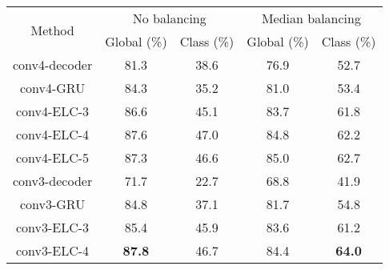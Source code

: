 \documentclass[10pt,twocolumn,letterpaper]{article}
\begin{document}


\begin{table*}
\begin{center}
\label{table:acs}
\begin{tabular}{c|c|c|c|c}
\hline
\multirow{2}{*}{Method} & \multicolumn{2}{c|}{No balancing}  & \multicolumn{2}{c}{ Median balancing} \\

 &   Global (\%) & Class (\%) & Global (\%) & Class (\%) \\



\hline \hline
conv4-decoder & 81.3 & 38.6 & 76.9 & 52.7 \\ %

conv4-GRU & 84.3 & 35.2 & 81.0  & 53.4 \\ %

\hline
\rowcolor{Gray}
conv4-ELC-3 & 86.6 & 45.1 & 83.7 & 61.8 \\ %

\rowcolor{Gray}
conv4-ELC-4 & 87.6 & 47.0 & 84.8 & 62.2 \\ %

\rowcolor{Gray}
conv4-ELC-5 & 87.3 & 46.6 & 85.0 & 62.7 \\

\hline \hline
conv3-decoder & 71.7  & 22.7 & 68.8 & 41.9 \\ %

conv3-GRU & 84.8 & 37.1 & 81.7  &  54.8 \\  %

\hline

\rowcolor{Gray}
conv3-ELC-3 & 85.4 & 45.9 & 83.6  &  61.2 \\ %

\rowcolor{Gray}
conv3-ELC-4 & \textbf{87.8} & 46.7 & 84.4 & \textbf{64.0} \\ %


\end{tabular}
\end{center}
\end{table*}
\end{document}
